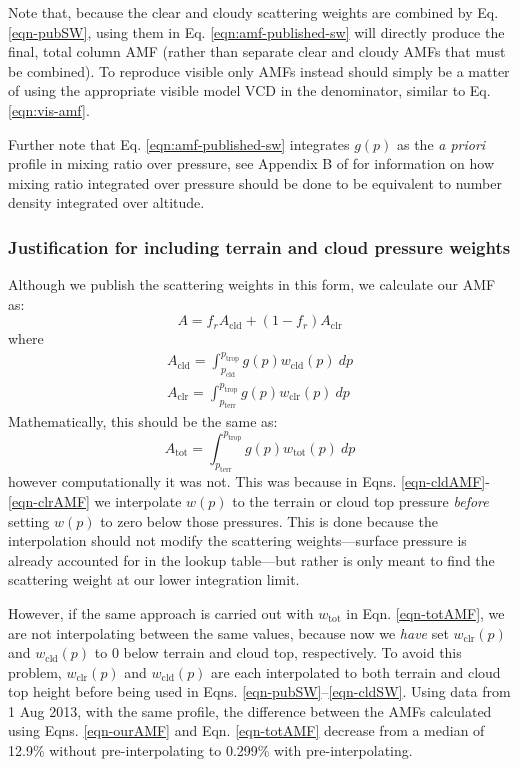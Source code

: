 \documentclass[12pt]{article}
\begin{document}
	Note that, because the clear and cloudy scattering weights are combined by Eq. \eqref{eqn-pubSW}, using them in Eq. \eqref{eqn:amf-published-sw} will directly produce the final, total column AMF (rather than separate clear and cloudy AMFs that must be combined). To reproduce visible only AMFs instead should simply be a matter of using the appropriate visible model VCD in the denominator, similar to Eq. \eqref{eqn:vis-amf}.
	
	Further note that Eq. \eqref{eqn:amf-published-sw} integrates $g(p)$ as the \emph{a priori} profile in mixing ratio over pressure, see Appendix B of \citet{ziemka01} for information on how mixing ratio integrated over pressure should be done to be equivalent to number density integrated over altitude.
	
	\subsubsection{Justification for including terrain and cloud pressure weights}
	Although we publish the scattering weights in this form, we calculate our AMF as:
	\begin{equation} \label{eqn-ourAMF}
		A = f_r A_\mathrm{cld} + (1-f_r) A_\mathrm{clr}
	\end{equation}
	where
	\begin{align}
		A_\mathrm{cld} = \int_{p_\mathrm{cld}}^{p_\mathrm{trop}} g(p) w_{\mathrm{cld}}(p) \: dp \label{eqn-cldAMF} \\
		A_\mathrm{clr} = \int_{p_\mathrm{terr}}^{p_\mathrm{trop}} g(p) w_{\mathrm{clr}}(p) \: dp \label{eqn-clrAMF}
	\end{align}
	Mathematically, this should be the same as:
	\begin{equation} \label{eqn-totAMF}
		A_\mathrm{tot} = \int_{p_\mathrm{terr}}^{p_\mathrm{trop}} g(p) w_{\mathrm{tot}}(p) \: dp
	\end{equation}
	however computationally it was not.  This was because in Eqns. \ref{eqn-cldAMF}-\ref{eqn-clrAMF} we interpolate $w(p)$ to the terrain or cloud top pressure \emph{before} setting $w(p)$ to zero below those pressures.  This is done because the interpolation should not modify the scattering weights---surface pressure is already accounted for in the lookup table---but rather is only meant to find the scattering weight at our lower integration limit.
	
	However, if the same approach is carried out with $w_\mathrm{tot}$ in Eqn. \ref{eqn-totAMF}, we are not interpolating between the same values, because now we \emph{have} set $w_\mathrm{clr}(p)$ and $w_\mathrm{cld}(p)$ to 0 below terrain and cloud top, respectively.  To avoid this problem, $w_\mathrm{clr}(p)$ and $w_\mathrm{cld}(p)$ are each interpolated to both terrain and cloud top height before being used in Eqns. \ref{eqn-pubSW}--\ref{eqn-cldSW}.  Using data from 1 Aug 2013, with the same  profile, the difference between the AMFs calculated using Eqns. \ref{eqn-ourAMF} and Eqn. \ref{eqn-totAMF} decrease from a median of 12.9\% without pre-interpolating to 0.299\% with pre-interpolating.
	


\end{document}
